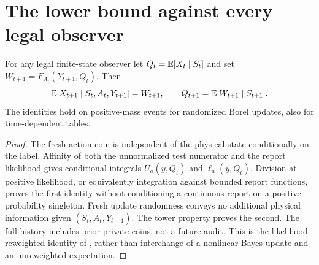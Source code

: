 \section{The lower bound against every legal observer}\label{sec:converse}
\begin{lemma}\label{lem:barycenter}
For any legal finite-state observer let $Q_t=\mathbb E[X_t\mid S_t]$ and set
$W_{t+1}=F_{A_t}(Y_{t+1},Q_t)$. Then
\[
 \mathbb E[X_{t+1}\mid S_t,A_t,Y_{t+1}]=W_{t+1},\qquad
 Q_{t+1}=\mathbb E[W_{t+1}\mid S_{t+1}].
\]
The identities hold on positive-mass events for randomized Borel updates, also for time-dependent tables.
\end{lemma}
\begin{proof}
The fresh action coin is independent of the physical state conditionally on the label. Affinity of both the unnormalized test numerator and the report likelihood gives conditional integrals $U_a(y,Q_t)$ and $\ell_a(y,Q_t)$. Division at positive likelihood, or equivalently integration against bounded report functions, proves the first identity without conditioning a continuous report on a positive-probability singleton. Fresh update randomness conveys no additional physical information given $(S_t,A_t,Y_{t+1})$. The tower property proves the second. The full history includes prior private coins, not a future audit. This is the likelihood-reweighted identity of \cite{GTFBayes,GTFControlled}, rather than interchange of a nonlinear Bayes update and an unreweighted expectation.
\end{proof}

